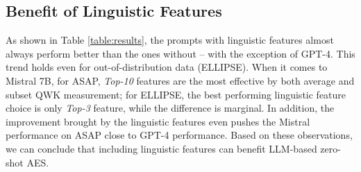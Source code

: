 \subsection{Benefit of Linguistic Features}
\label{effect-of-linguistic-features}
As shown in Table \ref{table:results}, the prompts with linguistic features almost always perform better than the ones without -- with the exception of GPT-4. This trend holds even for out-of-distribution data (ELLIPSE). When it comes to Mistral 7B, for ASAP, \textit{Top-10} features are the most effective by both average and subset QWK measurement; for ELLIPSE, the best performing linguistic feature choice is only \textit{Top-3} feature, while the difference is marginal. In addition, the improvement brought by the linguistic features even pushes the Mistral performance on ASAP close to GPT-4 performance. Based on these observations, we can conclude that including linguistic features can benefit LLM-based zero-shot AES.

